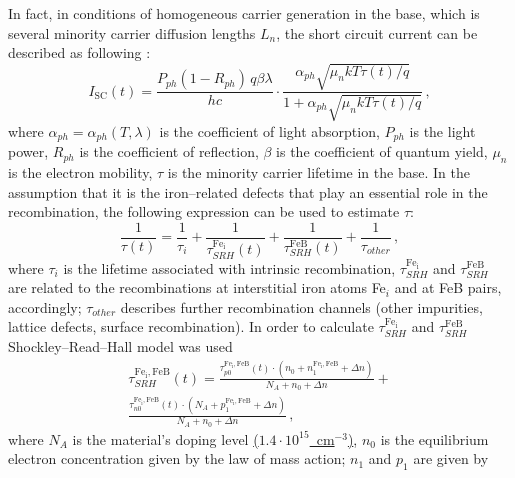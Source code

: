 \documentclass[%
 aip,jap,
 amsmath,amssymb,
 reprint,%
]{revtex4-1}
\begin{document}
In fact, in conditions of homogeneous carrier generation in the base, which is several minority carrier diffusion lengths $L_n$,
the short circuit current can be described as following \cite{Bube,Razeghi}:
\begin{equation}
\label{eqIsc}
I_\mathrm{SC}(t)=\frac{P_{ph}(1-R_{ph})\,q\beta\lambda}{hc}\cdot
\frac{\alpha_{ph}\sqrt{\mu_n k T \tau(t)/q}}{1+\alpha_{ph}\sqrt{\mu_n k T \tau(t)/q}}\,,
\end{equation}
where
$\alpha_{ph}=\alpha_{ph}(T,\lambda)$ is the coefficient of light absorption,
$P_{ph}$ is the light power,
$R_{ph}$ is the coefficient of reflection,
$\beta$ is the coefficient of quantum  yield,
$\mu_n$ is the electron mobility,
$\tau$ is the minority carrier lifetime in the base.
In the assumption that it is the iron--related defects that play an essential role in the recombination, the following expression can be used to estimate $\tau$:
\begin{equation}
\label{eqTau}
\frac{1}{\tau(t)}=\frac{1}{\tau_i}+\frac{1}{\tau_{SRH}^{\mathrm{Fe_i}}(t)}
+\frac{1}{\tau_{SRH}^\mathrm{FeB}(t)}+\frac{1}{\tau_{other}}\,,
\end{equation}
where
$\tau_i$ is the lifetime associated with intrinsic recombination,
$\tau_{SRH}^{\mathrm{Fe_i}}$ and $\tau_{SRH}^\mathrm{FeB}$ are related to the recombinations at interstitial iron atoms Fe$_i$ and at FeB pairs, accordingly;
$\tau_{other}$ describes further recombination channels
(other impurities, lattice defects, surface recombination).
In order to calculate $\tau_{SRH}^{\mathrm{Fe_i}}$ and $\tau_{SRH}^\mathrm{FeB}$
Shockley--Read--Hall model was used
\begin{eqnarray}
\label{eqTauSRH}
\tau_{SRH}^\mathrm{Fe_i,FeB}(t)=\frac{\tau_{p0}^\mathrm{Fe_i,FeB}(t)
\cdot(n_0+n_1^\mathrm{Fe_i,FeB}+\Delta n)}
{N_A+n_0+\Delta n}+\nonumber\\
\frac{\tau_{n0}^\mathrm{Fe_i,FeB}(t)\cdot(N_A+p_1^\mathrm{Fe_i,FeB}+\Delta n)}
{N_A+n_0+\Delta n}\,,
\end{eqnarray}
where
$N_A$ is the material’s doping level  \textcolor[rgb]{0.00,0.07,1.00}{\uline{($1.4\cdot10^{15}$~cm$^{-3}$)}},
$n_0$ is the equilibrium electron concentration given by the law of mass action;
$n_1$ and $p_1$ are given by
\end{document}
